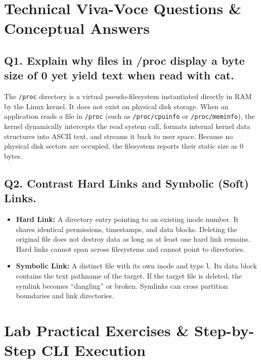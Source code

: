 \section{Technical Viva-Voce Questions \& Conceptual Answers}

\subsection*{Q1. Explain why files in /proc display a byte size of 0 yet yield text when read with cat.}
\begin{vivasol}
The \texttt{/proc} directory is a virtual pseudo-filesystem instantiated directly in RAM by the Linux kernel. It does not exist on physical disk storage. When an application reads a file in \texttt{/proc} (such as \texttt{/proc/cpuinfo} or \texttt{/proc/meminfo}), the kernel dynamically intercepts the read system call, formats internal kernel data structures into ASCII text, and streams it back to user space. Because no physical disk sectors are occupied, the filesystem reports their static size as 0 bytes.
\end{vivasol}

\subsection*{Q2. Contrast Hard Links and Symbolic (Soft) Links.}
\begin{vivasol}
\begin{itemize}[leftmargin=1.5em]
    \item \textbf{Hard Link:} A directory entry pointing to an existing inode number. It shares identical permissions, timestamps, and data blocks. Deleting the original file does not destroy data as long as at least one hard link remains. Hard links cannot span across filesystems and cannot point to directories.
    \item \textbf{Symbolic Link:} A distinct file with its own inode and type \texttt{l}. Its data block contains the text pathname of the target. If the target file is deleted, the symlink becomes ``dangling'' or broken. Symlinks can cross partition boundaries and link directories.
\end{itemize}
\end{vivasol}

\section{Lab Practical Exercises \& Step-by-Step CLI Execution}


